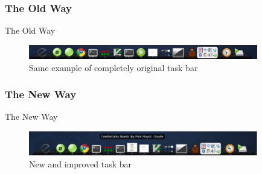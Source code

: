\documentclass{beamer}
\begin{document}
\subsubsection{The Old Way}
\begin{frame}{The Old Way}
  \begin{figure}
    \centering
    \includegraphics[width=100mm]{images/awn}
    \caption{Same example of completely original task bar}
  \end{figure}
\end{frame}

\subsubsection{The New Way}
\begin{frame}{The New Way}
  \begin{figure}
    \centering
    \includegraphics[width=100mm]{images/awn-new}
    \caption{New and improved task bar}
  \end{figure}
\end{frame}
\end{document}
